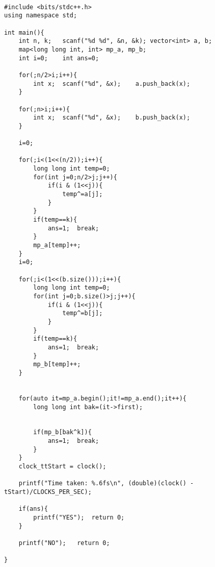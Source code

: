 \documentclass[12pt]{article}
\begin{document}
\begin{verbatim}
  
#include <bits/stdc++.h>
using namespace std;

int main(){
    int n, k;   scanf("%d %d", &n, &k); vector<int> a, b;
    map<long long int, int> mp_a, mp_b; 
    int i=0;    int ans=0;

    for(;n/2>i;i++){
        int x;  scanf("%d", &x);    a.push_back(x);
    }

    for(;n>i;i++){
        int x;  scanf("%d", &x);    b.push_back(x);
    }

    i=0;

    for(;i<(1<<(n/2));i++){
        long long int temp=0;
        for(int j=0;n/2>j;j++){
            if(i & (1<<j)){
                temp^=a[j];
            }
        }
        if(temp==k){
            ans=1;  break;
        }
        mp_a[temp]++;
    }
    i=0;

    for(;i<(1<<(b.size()));i++){
        long long int temp=0;
        for(int j=0;b.size()>j;j++){
            if(i & (1<<j)){
                temp^=b[j];
            }
        }
        if(temp==k){
            ans=1;  break;
        }
        mp_b[temp]++;
    }


    for(auto it=mp_a.begin();it!=mp_a.end();it++){
        long long int bak=(it->first);


        if(mp_b[bak^k]){
            ans=1;  break;
        }
    }
    clock_ttStart = clock();
    
    printf("Time taken: %.6fs\n", (double)(clock() - tStart)/CLOCKS_PER_SEC);
    
    if(ans){
        printf("YES");  return 0;
    }
    
    printf("NO");   return 0;

}
\end{verbatim}
\clearpage
\end{document}

